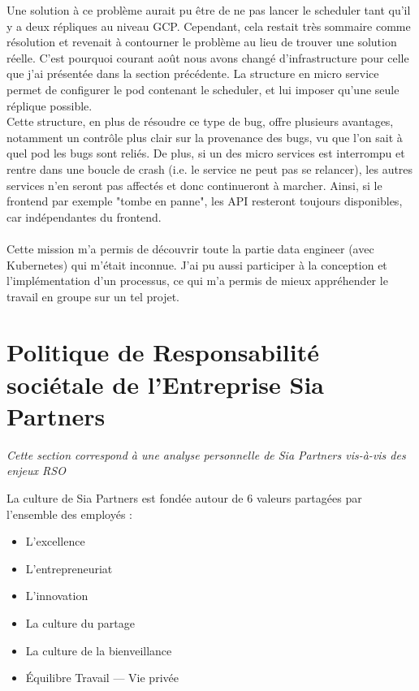 \documentclass{article} %
\begin{document}
Une solution à ce problème aurait pu être de ne pas lancer le scheduler tant qu'il y a deux répliques au niveau GCP. Cependant, cela restait très sommaire comme résolution et revenait à contourner le problème au lieu de trouver une solution réelle. C'est pourquoi courant août nous avons changé d'infrastructure pour celle que j'ai présentée dans la section précédente. La structure en micro service permet de configurer le pod contenant le scheduler, et lui imposer qu'une seule réplique possible.\\

Cette structure, en plus de résoudre ce type de bug, offre plusieurs avantages, notamment un contrôle plus clair sur la provenance des bugs, vu que l'on sait à quel pod les bugs sont reliés. De plus, si un des micro services est interrompu et rentre dans une boucle de crash (i.e. le service ne peut pas se relancer), les autres services n'en seront pas affectés et donc continueront à marcher. Ainsi, si le frontend par exemple "tombe en panne", les API resteront toujours disponibles, car indépendantes du frontend.\\ \\

Cette mission m'a permis de découvrir toute la partie data engineer (avec Kubernetes) qui m'était inconnue. J'ai pu aussi participer à la conception et l'implémentation d'un processus, ce qui m'a permis de mieux appréhender le travail en groupe sur un tel projet.


\newpage

\section{Politique de Responsabilité sociétale de l’Entreprise Sia Partners}
\textit{Cette section correspond à une analyse personnelle de Sia Partners vis-à-vis des enjeux RSO}

La culture de Sia Partners est fondée autour de 6 valeurs partagées par l’ensemble des employés :
\begin{itemize}
 \item L’excellence
 \item L'entrepreneuriat
 \item L’innovation
 \item La culture du partage
 \item La culture de la bienveillance
 \item Équilibre Travail — Vie privée
\end{itemize}
\end{document}
